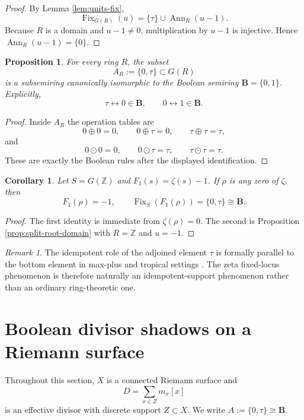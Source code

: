 \documentclass[11pt,a4paper]{article}
\newtheorem{proposition}[theorem]{Proposition}
\newtheorem{corollary}[theorem]{Corollary}
\theoremstyle{definition}
\theoremstyle{remark}
\newtheorem{remark}[theorem]{Remark}
\DeclareMathOperator{\Fix}{Fix}
\DeclareMathOperator{\Ann}{Ann}
\newcommand{\ZZ}{\mathbb Z}
\newcommand{\BB}{\mathbf B}
\newcommand{\taup}{\tau}
\begin{document}
\begin{proof}
By Lemma \ref{lem:units-fix},
\[
\Fix_{G(R)}(u)=\{\taup\}\cup\Ann_R(u-1).
\]
Because $R$ is a domain and $u-1\neq0$, multiplication by $u-1$ is injective.  Hence $\Ann_R(u-1)=\{0\}$.
\end{proof}

\begin{proposition}\label{prop:boolean-pair}
For every ring $R$, the subset
\[
A_R:=\{0,\taup\}\subset G(R)
\]
is a subsemiring canonically isomorphic to the Boolean semiring $\BB=\{0,1\}$.  Explicitly,
\[
\taup\longleftrightarrow 0\in\BB,
\qquad
0\longleftrightarrow 1\in\BB.
\]
\end{proposition}

\begin{proof}
Inside $A_R$ the operation tables are
\[
0\oplus0=0,\qquad 0\oplus\taup=0,\qquad \taup\oplus\taup=\taup,
\]
and
\[
0\odot0=0,\qquad 0\odot\taup=\taup,\qquad \taup\odot\taup=\taup.
\]
These are exactly the Boolean rules after the displayed identification.
\end{proof}

\begin{corollary}\label{cor:zeta-pointwise}
Let $S=G(\ZZ)$ and $F_1(s)=\zeta(s)-1$.  If $\rho$ is any zero of $\zeta$, then
\[
F_1(\rho)=-1,
\qquad
\Fix_S(F_1(\rho))=\{0,\taup\}\cong\BB.
\]
\end{corollary}

\begin{proof}
The first identity is immediate from $\zeta(\rho)=0$.  The second is Proposition \ref{prop:split-root-domain} with $R=\ZZ$ and $u=-1$.
\end{proof}

\begin{remark}
The idempotent role of the adjoined element $\taup$ is formally parallel to the bottom element in max-plus and tropical settings \cite{GaubertKatz,Gunawardena}.  The zeta fixed-locus phenomenon is therefore naturally an idempotent-support phenomenon rather than an ordinary ring-theoretic one.
\end{remark}

\section{Boolean divisor shadows on a Riemann surface}

Throughout this section, $X$ is a connected Riemann surface and
\[
D=\sum_{x\in Z} m_x[x]
\]
is an effective divisor with discrete support $Z\subset X$.  We write $A:=\{0,\taup\}\cong\BB$.
\end{document}
